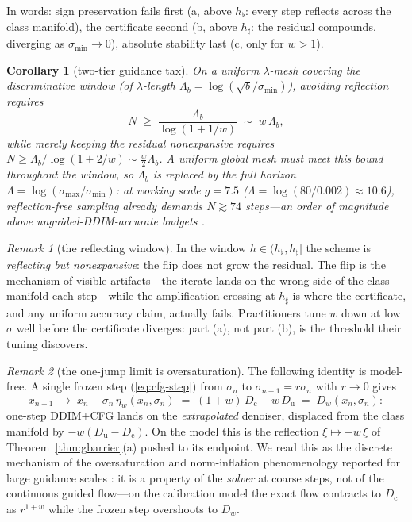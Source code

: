 \documentclass{article} %
\def\eqref#1{equation~\ref{#1}}
\theoremstyle{plain}
\newtheorem{corollary}{Corollary}
\theoremstyle{definition}
\theoremstyle{remark}
\newtheorem{remark}{Remark}
\providecommand{\smin}{\sigma_{\min}}
\providecommand{\smax}{\sigma_{\max}}
\providecommand{\Dc}{D_{\mathrm{c}}}
\providecommand{\Du}{D_{\mathrm{u}}}
\providecommand{\Dw}{D_{w}}
\providecommand{\etaw}{\eta_{w}}
\def\eqref#1{(\ref{#1})}
\begin{document}
In words: sign preservation fails first (a, above $h_\flat$: every step
reflects across the class manifold), the certificate second (b, above
$h_\sharp$: the residual compounds, diverging as $\smin\to0$), absolute
stability last (c, only for $w>1$).

\begin{corollary}[two-tier guidance tax]\label{cor:tax}
On a uniform $\lambda$-mesh covering the discriminative window (of
$\lambda$-length $\Lambda_b = \log(\sqrt b/\smin)$), avoiding
reflection requires
\begin{equation}\label{eq:tax}
  N \;\ge\; \frac{\Lambda_b}{\log(1+1/w)} \;\sim\; w\,\Lambda_b ,
\end{equation}
while merely keeping the residual nonexpansive requires $N \ge \Lambda_b/\log(1+2/w)
\sim \tfrac{w}{2}\Lambda_b$. A uniform \emph{global} mesh must meet this bound
throughout the window, so $\Lambda_b$ is replaced by the full horizon
$\Lambda=\log(\smax/\smin)$: at working scale $g = 7.5$
($\Lambda = \log(80/0.002) \approx 10.6$), reflection-free sampling already demands
$N \gtrsim 74$ steps---an order of magnitude above unguided-DDIM-accurate
budgets \citep{karras2022edm}.
\end{corollary}

\begin{remark}[the reflecting window]\label{rem:window}
In the window $h \in (h_\flat, h_\sharp]$ the scheme is \emph{reflecting
but nonexpansive}: the flip does not grow the residual. The flip is
the mechanism of visible artifacts---the iterate lands on the wrong side
of the class manifold each step---while the amplification crossing at $h_\sharp$ is
where the certificate, and any uniform accuracy claim, actually fails.
Practitioners tune $w$ down at low $\sigma$ well before the certificate
diverges: part (a), not part (b), is the threshold their tuning discovers.
\end{remark}

\begin{remark}[the one-jump limit is oversaturation]\label{rem:onejump}
The following identity is model-free. A single frozen step
\eqref{eq:cfg-step} from $\sigma_n$ to $\sigma_{n+1} = r\sigma_n$ with $r
\to 0$ gives
\begin{equation}\label{eq:onejump}
  x_{n+1} \;\to\; x_n - \sigma_n\,\etaw(x_n,\sigma_n)
  \;=\; (1+w)\,\Dc - w\,\Du \;=\; \Dw(x_n,\sigma_n):
\end{equation}
one-step DDIM$+$CFG lands on the \emph{extrapolated} denoiser, displaced
from the class manifold by $-w(\Du-\Dc)$. On the model this is the
reflection $\xi \mapsto -w\,\xi$ of Theorem~\ref{thm:gbarrier}(a) pushed to
its endpoint. We read this as the discrete mechanism of the oversaturation
and norm-inflation phenomenology reported for large guidance scales
\citep{sadat2025apg}: it is a property of the \emph{solver} at coarse steps, not
of the continuous guided flow---on the calibration model the exact flow
contracts to $\Dc$ as $r^{1+w}$ while the frozen step overshoots to $\Dw$.
\end{remark}
\end{document}
